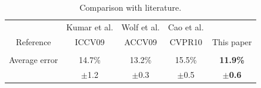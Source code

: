 \begin{table}
\caption{Comparison with literature.} 

\begin{tabular}{|c||c|c|c|c|}
\hline
 & Kumar et al. & Wolf et al. & Cao et al. & \\
Reference & ICCV09 & ACCV09 & CVPR10 & This paper\\
& \cite{kumar:iccv09} & \cite{wolf:accv09} & \cite{cao2010face} & \\
\hline\hline
Average error & 14.7\% & 13.2\% & 15.5\% & \bf{11.9\%} \\
& $\pm$1.2 & $\pm$0.3 & $\pm$0.5 & \bf{$\pm$0.6} \\
\hline
\end{tabular}
\label{tab:table_soa}
\end{table}



